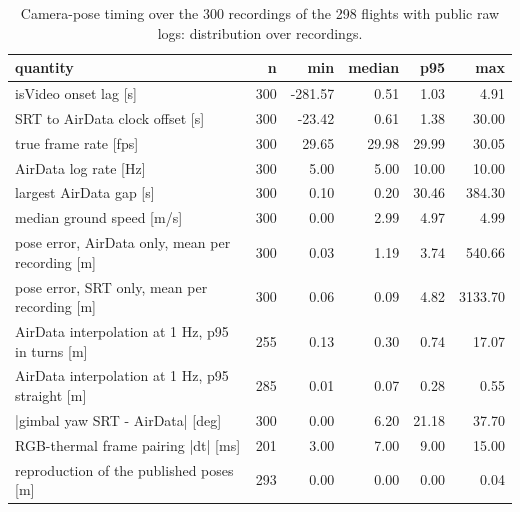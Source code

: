 \begin{table}[t]
\centering
\small
\caption{Camera-pose timing over the 300 recordings of the 298 flights with public raw logs: distribution over recordings.}
\label{tab:timing}
\begin{tabular}{lrrrrr}
\toprule
quantity & n & min & median & p95 & max \\
\midrule
isVideo onset lag [s] & 300 & -281.57 & 0.51 & 1.03 & 4.91 \\
SRT to AirData clock offset [s] & 300 & -23.42 & 0.61 & 1.38 & 30.00 \\
true frame rate [fps] & 300 & 29.65 & 29.98 & 29.99 & 30.05 \\
AirData log rate [Hz] & 300 & 5.00 & 5.00 & 10.00 & 10.00 \\
largest AirData gap [s] & 300 & 0.10 & 0.20 & 30.46 & 384.30 \\
median ground speed [m/s] & 300 & 0.00 & 2.99 & 4.97 & 4.99 \\
pose error, AirData only, mean per recording [m] & 300 & 0.03 & 1.19 & 3.74 & 540.66 \\
pose error, SRT only, mean per recording [m] & 300 & 0.06 & 0.09 & 4.82 & 3133.70 \\
AirData interpolation at 1 Hz, p95 in turns [m] & 255 & 0.13 & 0.30 & 0.74 & 17.07 \\
AirData interpolation at 1 Hz, p95 straight [m] & 285 & 0.01 & 0.07 & 0.28 & 0.55 \\
|gimbal yaw SRT - AirData| [deg] & 300 & 0.00 & 6.20 & 21.18 & 37.70 \\
RGB-thermal frame pairing |dt| [ms] & 201 & 3.00 & 7.00 & 9.00 & 15.00 \\
reproduction of the published poses [m] & 293 & 0.00 & 0.00 & 0.00 & 0.04 \\
\bottomrule
\end{tabular}
\end{table}
